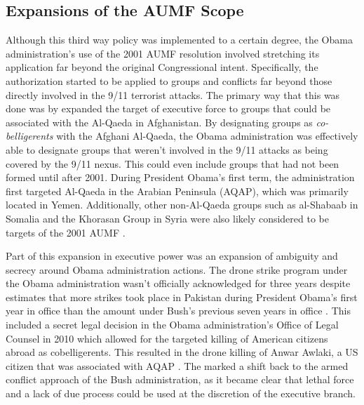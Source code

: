 \documentclass[12pt]{article}
\begin{document}
\subsection*{Expansions of the AUMF Scope}
Although this third way policy was implemented to a certain degree, the Obama administration's use of the 2001 AUMF resolution involved stretching its application far beyond the original Congressional intent.
Specifically, the authorization started to be applied to groups and conflicts far beyond those directly involved in the 9/11 terrorist attacks.
The primary way that this was done was by expanded the target of executive force to groups that could be associated with the Al-Qaeda in Afghanistan.
By designating groups as \emph{co-belligerents} with the Afghani Al-Qaeda, the Obama administration was effectively able to designate groups that weren't involved in the 9/11 attacks as being covered by the 9/11 nexus.
This could even include groups that had not been formed until after 2001.
During President Obama's first term, the administration first targeted Al-Qaeda in the Arabian Peninsula (AQAP), which was primarily located in Yemen.
Additionally, other non-Al-Qaeda groups such as al-Shabaab in Somalia and the Khorasan Group in Syria were also likely considered to be targets of the 2001 AUMF \autocite[189]{murray2015}.

Part of this expansion in executive power was an expansion of ambiguity and secrecy around Obama administration actions.
The drone strike program under the Obama administration wasn't officially acknowledged for three years despite estimates that more strikes took place in Pakistan during President Obama's first year in office than the amount under Bush's previous seven years in office \autocite[189]{murray2015}.
This included a secret legal decision in the Obama administration's Office of Legal Counsel in 2010 which allowed for the targeted killing of American citizens abroad as cobelligerents. 
This resulted in the drone killing of Anwar Awlaki, a US citizen that was associated with AQAP \autocite[191]{murray2015}.
The marked a shift back to the armed conflict approach of the Bush administration, as it became clear that lethal force and a lack of due process could be used at the discretion of the executive branch.
\end{document}
